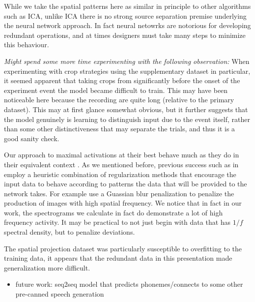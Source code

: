 \documentclass[utf8]{frontiersSCNS} %
\begin{document}
While we take the spatial patterns here as similar in principle to other algorithms such as ICA, unlike ICA there is no strong source separation premise underlying the neural network approach. In fact neural netowrks are notorious for developing redundant operations, and at times designers must take many steps to minimize this behaviour. 

{\em Might spend some more time experimenting with the following observation:} When experimenting with crop strategies using the supplementary dataset in particular, it seemed apparent that taking crops from significantly before the onset of the experiment event the model became difficult to train. This may have been noticeable here because the recording are quite long (relative to the primary dataset). This may at first glance somewhat obvious, but it further suggests that the model genuinely is learning to distinguish input due to the event itself, rather than some other distinctiveness that may separate the trials, and thus it is a good sanity check.

Our approach to maximal activations at their best behave much as they do in their equivalent context . As we mentioned before, previous success such as in \cite{Yosinski2015} employ a heuristic combination of regularization methods that encourage the input data to behave according to patterns the data that will be provided to the network takes. For example \cite{Yosinski2015} use a Guassian blur penalization to penalize the production of images with high spatial frequency. We notice that in fact in our work, the spectrograms we calculate in fact do demonstrate a lot of high frequency activity. It may be practical to not just begin with data that has $1/f$ spectral density, but to penalize deviations.

The spatial projection dataset was particularly susceptible to overfitting to the training data, it appears that the redundant data in this presentation made generalization more difficult. 

\begin{itemize}
\item future work: seq2seq model that predicts phonemes/connects to some other pre-canned speech generation
\end{itemize}


\end{document}
